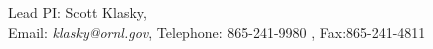 \begin{center}
Lead PI: Scott Klasky, \ORNL\\
Email: \emph{klasky@ornl.gov}, Telephone: 865-241-9980 , Fax:865-241-4811
\end{center}
